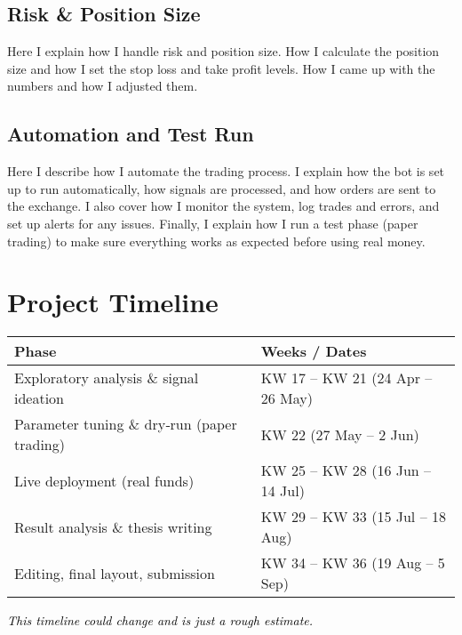 \documentclass[a4paper,12pt]{article}
\begin{document}
\subsection{Risk \& Position Size}

Here I explain how I handle risk and position size. How I
calculate the position size and how I set the stop loss and take
profit levels. How I came up with the numbers and how I adjusted them.

\newpage

\subsection{Automation and Test Run}

Here I describe how I automate the trading process. I explain how the bot is set up to run automatically, how signals are processed, and how orders are sent to the exchange. I also cover how I monitor the system, log trades and errors, and set up alerts for any issues. Finally, I explain how I run a test phase (paper trading) to make sure everything works as expected before using real money.

\section{Project Timeline}

\begin{tabular}{ll}
\toprule
\textbf{Phase} & \textbf{Weeks / Dates} \\
\midrule
Exploratory analysis \& signal ideation      & KW 17 – KW 21 (24 Apr – 26 May) \\
Parameter tuning \& dry‑run (paper trading)  & KW 22 (27 May – 2 Jun) \\
Live deployment (real funds)                 & KW 25 – KW 28 (16 Jun – 14 Jul) \\
Result analysis \& thesis writing           & KW 29 – KW 33 (15 Jul – 18 Aug) \\
Editing, final layout, submission           & KW 34 – KW 36 (19 Aug – 5 Sep) \\
\bottomrule
\end{tabular}

\noindent\colorbox{blue!15}{\parbox{\textwidth}{\textcolor{black}{\textit{This timeline could change and is just a rough estimate.\\}}}}

\end{document}
